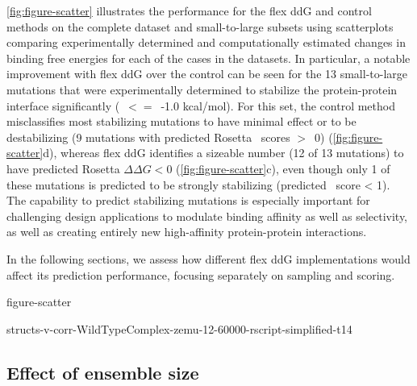 \cref{fig:figure-scatter} illustrates the performance for the flex ddG and control methods on the complete dataset and small-to-large subsets using scatterplots comparing experimentally determined and computationally estimated changes in binding free energies for each of the cases in the datasets. In particular, a notable improvement with flex ddG over the control can be seen for the 13 small-to-large mutations that were experimentally determined to stabilize the protein-protein interface significantly (\ddg\ $<=$\ -1.0 kcal/mol). For this set, the control method misclassifies most stabilizing mutations to have minimal effect or to be destabilizing (9 mutations with predicted Rosetta \ddg\ scores $>$\ 0) (\cref{fig:figure-scatter}d), whereas flex ddG identifies a sizeable number (12 of 13 mutations) to have predicted Rosetta $\Delta\Delta G < 0$ (\cref{fig:figure-scatter}c), even though only 1 of these mutations is predicted to be strongly stabilizing (predicted \ddg\ score < 1). The capability to predict stabilizing mutations is especially important for challenging design applications to modulate binding affinity as well as selectivity, as well as creating entirely new high-affinity protein-protein interactions.

In the following sections, we assess how different flex ddG implementations would affect its prediction performance, focusing separately on sampling and scoring.

{figure-scatter}

{structs-v-corr-WildTypeComplex-zemu-12-60000-rscript-simplified-t14}

\subsection{Effect of ensemble size}

